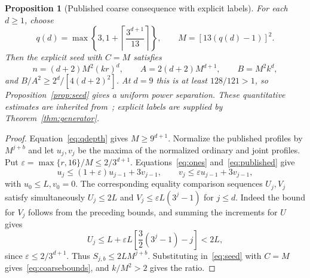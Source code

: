\documentclass[11pt]{amsart}
\newtheorem{proposition}[theorem]{Proposition}
\theoremstyle{definition}
\theoremstyle{remark}
\newcommand{\ceil}[1]{\left\lceil#1\right\rceil}
\begin{document}
\begin{proposition}[Published coarse consequence with explicit labels]
\label{prop:coarse}
For each $d\ge1$, choose
\begin{equation}\label{eq:qdepth}
 q(d)=\max\left\{3,1+\ceil{\frac{3^{d+1}}{13}}\right\},\qquad
 M=[13(q(d)-1)]^2.
\end{equation}
Then the explicit seed with $C=M$ satisfies
\begin{equation}\label{eq:coarsebounds}
 n=(d+2)M^2(kr)^d,\qquad
 A=2(d+2)M^{d+1},\qquad B=M^2k^d,
\end{equation}
and $B/A^2\ge2^d/[4(d+2)^2]$. At $d=9$ this is at least
$128/121>1$, so Proposition~\ref{prop:seed} gives a uniform power
separation. These quantitative estimates are inherited
from~\cite{OpenAI132}; explicit labels are supplied by
Theorem~\ref{thm:generator}.
\end{proposition}
\begin{proof}
Equation~\eqref{eq:qdepth} gives $M\ge9^{d+1}$. Normalize the
published profiles by $M^{j+b}$ and let $u_j,v_j$ be the maxima of
the normalized ordinary and joint profiles. Put
$\varepsilon=\max\{r,16\}/M\le2/3^{d+1}$.
Equations~\eqref{eq:ones} and~\eqref{eq:published} give
\[
 u_j\le(1+\varepsilon)u_{j-1}+3v_{j-1},\qquad
 v_j\le\varepsilon u_{j-1}+3v_{j-1},
\]
with $u_0\le L,v_0=0$. The corresponding equality comparison
sequences $U_j,V_j$ satisfy simultaneously
$U_j\le2L$ and $V_j\le\varepsilon L(3^j-1)$ for $j\le d$.
Indeed the bound for $V_j$ follows from the preceding bounds, and
summing the increments for $U$ gives
\[
 U_j\le L+\varepsilon L\left[\frac32(3^j-1)-j\right]<2L,
\]
since $\varepsilon\le2/3^{d+1}$. Thus
$S_{j,b}\le2LM^{j+b}$. Substituting in~\eqref{eq:seed} with $C=M$
gives~\eqref{eq:coarsebounds}, and $k/M^2>2$ gives the ratio.
\end{proof}
\end{document}
